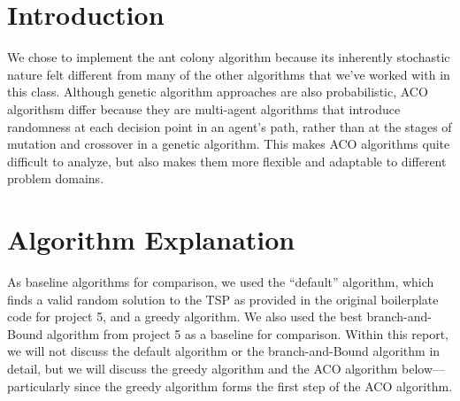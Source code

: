 



\section{Introduction} %

We chose to implement the ant colony algorithm because its inherently stochastic
nature felt different from many of the other algorithms that we've worked with
in this class. Although genetic algorithm approaches are also probabilistic, ACO
algorithsm differ because they are multi-agent algorithms that introduce randomness
at each decision point in an agent's path, rather than at the stages of mutation and
crossover in a genetic algorithm. This makes ACO algorithms quite difficult to analyze,
but also makes them more flexible and adaptable to different problem domains.


\section{Algorithm Explanation} %

As baseline algorithms for comparison, we used the ``default'' algorithm, which
finds a valid random solution to the TSP as provided in the original boilerplate
code for project 5, and a greedy algorithm. We also used the best branch-and-Bound
algorithm from project 5 as a baseline for comparison. Within this report, we
will not discuss the default algorithm or the branch-and-Bound algorithm in detail,
but we will discuss the greedy algorithm and the ACO algorithm below---particularly
since the greedy algorithm forms the first step of the ACO algorithm.

